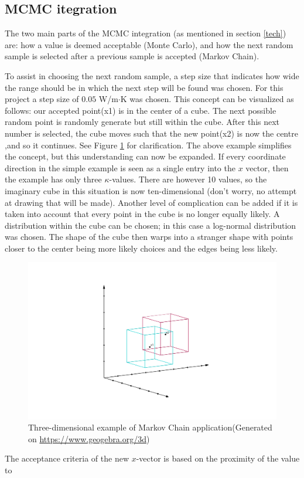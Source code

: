 	\subsection{MCMC itegration}\label{mcmcexp}
	The two main parts of the MCMC integration (as mentioned in section \ref{tech}) are: how a value is deemed acceptable (Monte Carlo), and how the next random sample is selected after a previous sample is accepted (Markov Chain).
	
	To assist in choosing the next random sample, a step size that indicates how wide the range should be in which the next step will be found was chosen. 
	For this project a step size of $0.05$ W/m$\cdot$K was chosen.
	This concept can be visualized as follows: our accepted point(x1) is in the center of a cube. The next possible random point is randomly generate but still within the cube. 	
	After this next number is selected, the cube moves such that the new point(x2) is now the centre ,and so it continues.
	See Figure \ref{cubeexplfig} for clarification.
	The above example simplifies the concept, but this understanding can now be expanded.
	If every coordinate direction in the simple example is seen as a single entry into the $x$ vector, then the example has only three $\kappa$-values.
	There are however 10 values, so the imaginary cube in this situation is now ten-dimensional (don't worry, no attempt at drawing that will be made).
	Another level of complication can be added if it is taken into account that every point in the cube is no longer equally likely.
	A distribution within the cube can be chosen; in this case a log-normal distribution was chosen.
	The shape of the cube then warps into a stranger shape with points closer to the center being more likely choices and the edges being less likely.
	\begin{figure}
	
	\includegraphics[width=\linewidth]{figures/MC_cubes.png}
	\caption{Three-dimensional example of Markov Chain application(Generated on \url{https://www.geogebra.org/3d})}
	\label{cubeexplfig}
	\end{figure}
	
	
	The acceptance criteria of the new $x$-vector is based on the proximity of the value to 
	
	
